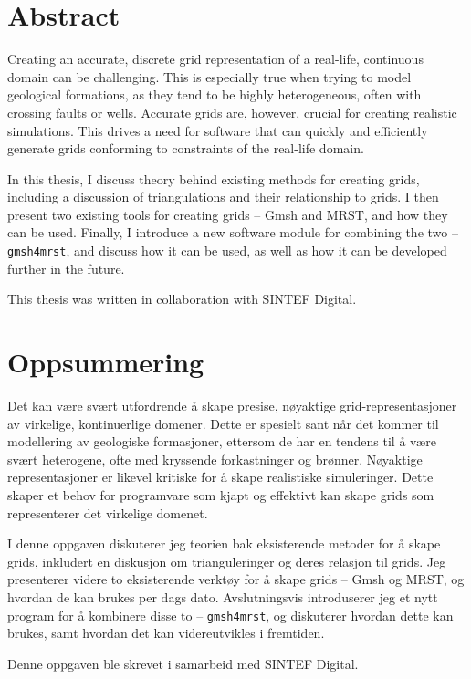 \section{Abstract}
Creating an accurate, discrete grid representation of a real-life, continuous domain can be challenging. This is especially true when trying to model geological formations, as they tend to be highly heterogeneous, often with crossing faults or wells. Accurate grids are, however, crucial for creating realistic simulations. This drives a need for software that can quickly and efficiently generate grids conforming to constraints of the real-life domain.

In this thesis, I discuss theory behind existing methods for creating grids, including a discussion of triangulations and their relationship to grids. I then present two existing tools for creating grids -- Gmsh and MRST, and how they can be used. Finally, I introduce a new software module for combining the two -- \verb|gmsh4mrst|, and discuss how it can be used, as well as how it can be developed further in the future.

This thesis was written in collaboration with SINTEF Digital.

\section{Oppsummering}
Det kan være svært utfordrende å skape presise, nøyaktige grid-representasjoner av virkelige, kontinuerlige domener. Dette er spesielt sant når det kommer til modellering av geologiske formasjoner, ettersom de har en tendens til å være svært heterogene, ofte med kryssende forkastninger og brønner. Nøyaktige representasjoner er likevel kritiske for å skape realistiske simuleringer. Dette skaper et behov for programvare som kjapt og effektivt kan skape grids som representerer det virkelige domenet.

I denne oppgaven diskuterer jeg teorien bak eksisterende metoder for å skape grids, inkludert en diskusjon om trianguleringer og deres relasjon til grids. Jeg presenterer videre to eksisterende verktøy for å skape grids -- Gmsh og MRST, og hvordan de kan brukes per dags dato. Avslutningsvis introduserer jeg et nytt program for å kombinere disse to -- \verb|gmsh4mrst|, og diskuterer hvordan dette kan brukes, samt hvordan det kan videreutvikles i fremtiden.

Denne oppgaven ble skrevet i samarbeid med SINTEF Digital.